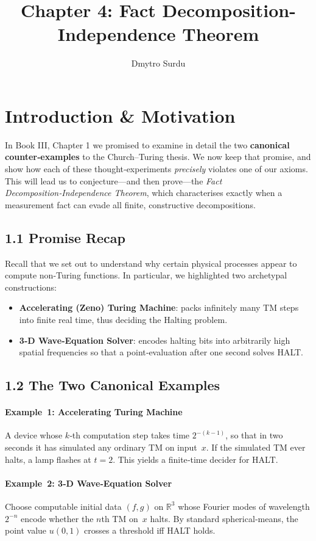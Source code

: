 \documentclass[12pt]{article}
\title{\textbf{Chapter 4: Fact Decomposition-Independence Theorem}}
\author{Dmytro Surdu}
\theoremstyle{definition}
\theoremstyle{plain}
\begin{document}
\maketitle

\section{Introduction \& Motivation}

In Book III, Chapter 1 we promised to examine in detail the two \textbf{canonical counter‑examples} to the Church–Turing thesis.  We now keep that promise, and show how each of these thought‑experiments \emph{precisely} violates one of our axioms.  This will lead us to conjecture—and then prove—the \emph{Fact Decomposition‑Independence Theorem}, which characterises exactly when a measurement fact can evade all finite, constructive decompositions.

\subsection*{1.1 Promise Recap}
Recall that we set out to understand why certain physical processes appear to compute non‑Turing functions.  In particular, we highlighted two archetypal constructions:
\begin{itemize}
  \item \textbf{Accelerating (Zeno) Turing Machine}: packs infinitely many TM steps into finite real time, thus deciding the Halting problem.
  \item \textbf{3‑D Wave‑Equation Solver}: encodes halting bits into arbitrarily high spatial frequencies so that a point‑evaluation after one second solves HALT.
\end{itemize}

\subsection*{1.2 The Two Canonical Examples}
\paragraph{Example 1: Accelerating Turing Machine}  
A device whose $k$‑th computation step takes time $2^{-(k-1)}$, so that in two seconds it has simulated any ordinary TM on input~$x$.  If the simulated TM ever halts, a lamp flashes at $t\!=\!2$.  This yields a finite‑time decider for HALT.

\paragraph{Example 2: 3‑D Wave‑Equation Solver}  
Choose computable initial data $(f,g)$ on $\mathbb{R}^3$ whose Fourier modes of wavelength $2^{-n}$ encode whether the $n$th TM on~$x$ halts.  By standard spherical‑means, the point value $u(0,1)$ crosses a threshold iff HALT holds.
\end{document}
